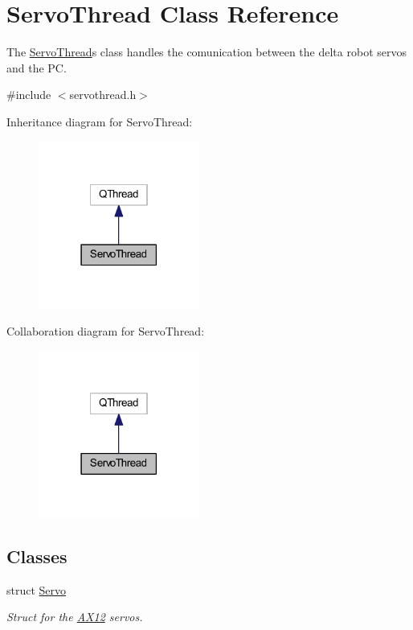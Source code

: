 \hypertarget{class_servo_thread}{}\section{Servo\+Thread Class Reference}
\label{class_servo_thread}


The \hyperlink{class_servo_thread}{Servo\+Thread}\textquotesingle{}s class handles the comunication between the delta robot servos and the P\+C.  




{\ttfamily \#include $<$servothread.\+h$>$}



Inheritance diagram for Servo\+Thread\+:\nopagebreak
\begin{figure}[H]
\begin{center}
\leavevmode
\includegraphics[width=150pt]{d1/d76/class_servo_thread__inherit__graph}
\end{center}
\end{figure}


Collaboration diagram for Servo\+Thread\+:\nopagebreak
\begin{figure}[H]
\begin{center}
\leavevmode
\includegraphics[width=150pt]{d9/d9e/class_servo_thread__coll__graph}
\end{center}
\end{figure}
\subsection*{Classes}
\begin{DoxyCompactItemize}
\item 
struct \hyperlink{struct_servo_thread_1_1_servo}{Servo}
\begin{DoxyCompactList}\small\item\em Struct for the \hyperlink{class_a_x12}{A\+X12} servos. \end{DoxyCompactList}\end{DoxyCompactItemize}
